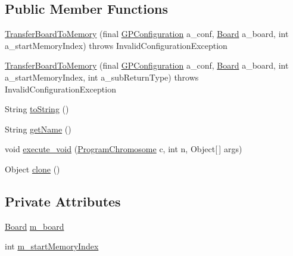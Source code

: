 \subsection*{Public Member Functions}
\begin{DoxyCompactItemize}
\item 
\hyperlink{classexamples_1_1gp_1_1tictactoe_1_1_transfer_board_to_memory_ada48a6a17f997131abcb1f3f3f11d159}{Transfer\-Board\-To\-Memory} (final \hyperlink{classorg_1_1jgap_1_1gp_1_1impl_1_1_g_p_configuration}{G\-P\-Configuration} a\-\_\-conf, \hyperlink{classexamples_1_1gp_1_1tictactoe_1_1_board}{Board} a\-\_\-board, int a\-\_\-start\-Memory\-Index)  throws Invalid\-Configuration\-Exception 
\item 
\hyperlink{classexamples_1_1gp_1_1tictactoe_1_1_transfer_board_to_memory_a381358f901d4de4ad2f02a07dd52a8a4}{Transfer\-Board\-To\-Memory} (final \hyperlink{classorg_1_1jgap_1_1gp_1_1impl_1_1_g_p_configuration}{G\-P\-Configuration} a\-\_\-conf, \hyperlink{classexamples_1_1gp_1_1tictactoe_1_1_board}{Board} a\-\_\-board, int a\-\_\-start\-Memory\-Index, int a\-\_\-sub\-Return\-Type)  throws Invalid\-Configuration\-Exception 
\item 
String \hyperlink{classexamples_1_1gp_1_1tictactoe_1_1_transfer_board_to_memory_a14de90c0d1056fec8bfbecc90bbbdac9}{to\-String} ()
\item 
String \hyperlink{classexamples_1_1gp_1_1tictactoe_1_1_transfer_board_to_memory_a26f88ae71db64851f9e8a508717ca117}{get\-Name} ()
\item 
void \hyperlink{classexamples_1_1gp_1_1tictactoe_1_1_transfer_board_to_memory_a0d1905dee893632746eb435e1858e6b4}{execute\-\_\-void} (\hyperlink{classorg_1_1jgap_1_1gp_1_1impl_1_1_program_chromosome}{Program\-Chromosome} c, int n, Object\mbox{[}$\,$\mbox{]} args)
\item 
Object \hyperlink{classexamples_1_1gp_1_1tictactoe_1_1_transfer_board_to_memory_a9d11ee176262a3b38a7128379a560c41}{clone} ()
\end{DoxyCompactItemize}
\subsection*{Private Attributes}
\begin{DoxyCompactItemize}
\item 
\hyperlink{classexamples_1_1gp_1_1tictactoe_1_1_board}{Board} \hyperlink{classexamples_1_1gp_1_1tictactoe_1_1_transfer_board_to_memory_a7b6005b6b5149d19419491044af8ba79}{m\-\_\-board}
\item 
int \hyperlink{classexamples_1_1gp_1_1tictactoe_1_1_transfer_board_to_memory_ace8741f1bb75b7675549c1f8037e96e5}{m\-\_\-start\-Memory\-Index}
\end{DoxyCompactItemize}
